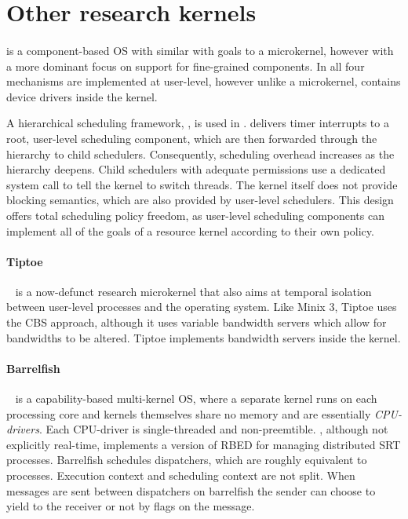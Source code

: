 \section{Other research kernels}

\paragraph{\composite} is a component-based \gls{OS} with similar with goals to a microkernel, however with a more dominant focus on support for fine-grained components.
In \composite all four mechanisms are implemented at user-level, however unlike a microkernel, \composite contains device drivers inside the kernel.

A hierarchical scheduling framework, \hires\citep{Parmer_West_2011}, is used in \composite.
\hires delivers timer interrupts to a root, user-level scheduling component, which are then forwarded through the hierarchy to child schedulers.
Consequently, scheduling overhead increases as the hierarchy deepens.
Child schedulers with adequate permissions use a dedicated system call to tell the kernel to switch threads.
The kernel itself does not provide blocking semantics, which are also provided by user-level schedulers.
This design offers total scheduling policy freedom, as user-level scheduling components can implement all of the goals of a resource kernel according to their own policy.
 
\paragraph{Tiptoe}~\citep{Craciunas_KPRS_2009} is a now-defunct research microkernel that also aims at temporal isolation between user-level processes and the operating system.
Like {\sc Minix 3}, Tiptoe uses the \gls{CBS} approach, although it uses variable bandwidth servers which allow for bandwidths to be altered.
Tiptoe implements bandwidth servers inside the kernel.

\paragraph{Barrelfish}~\citep{Peter_SBBIHR_2010} is a capability-based multi-kernel \gls{OS}, where a separate kernel runs on each processing core and kernels themselves share no memory and are essentially \emph{\gls{CPU}-drivers}.
Each CPU-driver is single-threaded and non-preemtible. 
 , although not explicitly real-time, implements a version of \gls{RBED} for managing distributed \gls{SRT} processes.
Barrelfish schedules dispatchers, which are roughly equivalent to processes. 
Execution context and scheduling context are not split.
When messages are sent between dispatchers on barrelfish the sender can choose to yield to the receiver or not by flags on the message.

